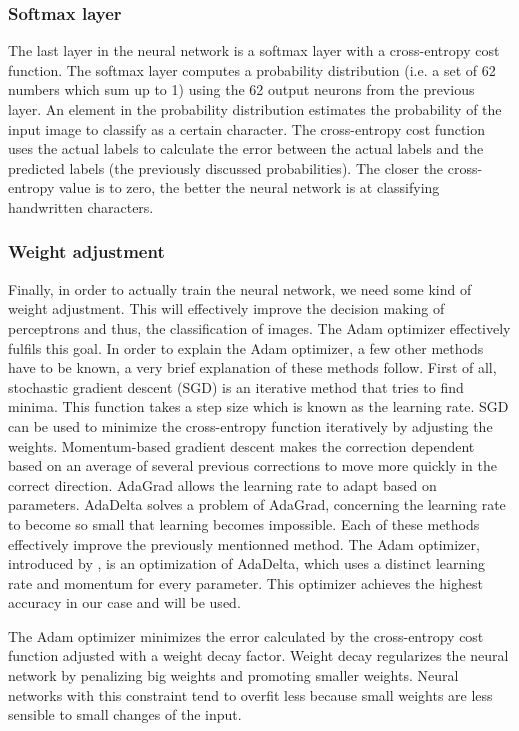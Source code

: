 \documentclass{article}
\begin{document}
\subsubsection{Softmax layer}
 The last layer in the neural network is a softmax layer with a cross-entropy cost function. The softmax layer computes a probability distribution (i.e. a set of 62 numbers which sum up to 1) using the 62 output neurons from the previous layer. An element in the probability distribution estimates the probability of the input image to classify as a certain character.
 The cross-entropy cost function uses the actual labels to calculate the error between the actual labels and the predicted labels (the previously discussed probabilities). The closer the cross-entropy value is to zero, the better the neural network is at classifying handwritten characters.
 \subsubsection{Weight adjustment}
Finally, in order to actually train the neural network, we need some kind of weight adjustment. This will effectively improve the decision making of perceptrons and thus, the classification of images.
The Adam optimizer effectively fulfils this goal. In order to explain the Adam optimizer, a few other methods have to be known, a very brief explanation of these methods follow.
First of all, stochastic gradient descent (SGD) is an iterative method that tries to find minima. This function takes a step size which is known as the learning rate. SGD can be used to minimize the cross-entropy function iteratively by adjusting the weights.
Momentum-based gradient descent makes the correction dependent based on an average of several previous corrections to move more quickly in the correct direction.
AdaGrad allows the learning rate to adapt based on parameters. AdaDelta solves a problem of AdaGrad, concerning the learning rate to become so small that learning becomes impossible.
Each of these methods effectively improve the previously mentionned method.
The Adam optimizer, introduced by \cite{adam}, is an optimization of AdaDelta, which uses a distinct learning rate and momentum for every parameter. This optimizer achieves the highest accuracy in our case and will be used.

The Adam optimizer minimizes the error calculated by the cross-entropy cost function adjusted with a weight decay factor. Weight decay regularizes the neural network by penalizing big weights and promoting smaller weights. Neural networks with this constraint tend to overfit less because small weights are less sensible to small changes of the input. \cite{presham}
\end{document}
